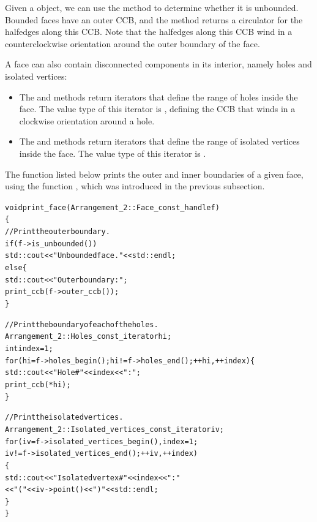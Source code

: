 Given a  object, we can use the 
method to determine whether it is unbounded. Bounded faces have an
outer CCB, and the  method returns a circulator
for the halfedges along this CCB. Note that the halfedges along
this CCB wind in a counterclockwise orientation around the outer
boundary of the face.

A face can also contain disconnected components in its interior,
namely holes and isolated vertices:
\begin{itemize}
\item The  and  methods return
 iterators that define the range
of holes inside the face. The value type of this iterator is
, defining the CCB that winds in a
clockwise orientation around a hole.
\item The  and
 methods return
 iterators that
define the range of isolated vertices inside the face. The value
type of this iterator is .
\end{itemize}

The function  listed below prints the outer and
inner boundaries of a given face, using the function ,
which was introduced in the previous subsection.
\begin{alltt}
void print_face (Arrangement_2::Face_const_handle f)
\{
  // Print the outer boundary.
  if (f->is_unbounded())
    std::cout << "Unbounded face. " << std::endl;
  else \{
    std::cout << "Outer boundary: ";
    print_ccb (f->outer_ccb());
  \}

  // Print the boundary of each of the holes.
  Arrangement_2::Holes_const_iterator hi;
  int                                 index = 1;
  for (hi = f->holes_begin(); hi != f->holes_end(); ++hi, ++index) \{
    std::cout << "    Hole #" << index << ": ";
    print_ccb (*hi);
  \}

  // Print the isolated vertices.
  Arrangement_2::Isolated_vertices_const_iterator iv;
  for (iv = f->isolated_vertices_begin(), index = 1;
       iv != f->isolated_vertices_end(); ++iv, ++index)
  \{
    std::cout << "    Isolated vertex #" << index << ": "
              << "(" << iv->point() << ")" << std::endl;
  \}
\}
\end{alltt}

